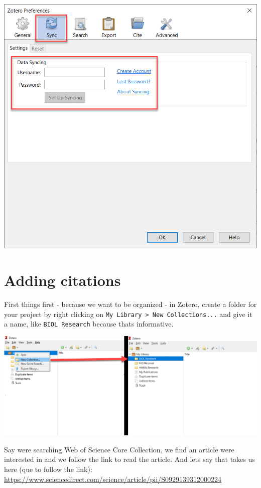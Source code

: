 \documentclass[
]{book}
\begin{document}
\includegraphics{images/Z_Sync.png}

\hypertarget{adding-citations}{%
\section{Adding citations}\label{adding-citations}}

First things first - because we want to be organized - in Zotero, create a folder for your project by right clicking on \texttt{My\ Library\ \textgreater{}\ New\ Collections...} and give it a name, like \texttt{BIOL\ Research} because that\textquotesingle s informative.

\includegraphics{images/Z_BIOLResearch.png}

Say we\textquotesingle re searching Web of Science Core Collection, we find an article we\textquotesingle re interested in and we follow the link to read the article. And let\textquotesingle s say that takes us here (que to follow the link): \url{https://www.sciencedirect.com/science/article/pii/S0929139312000224}
\end{document}
